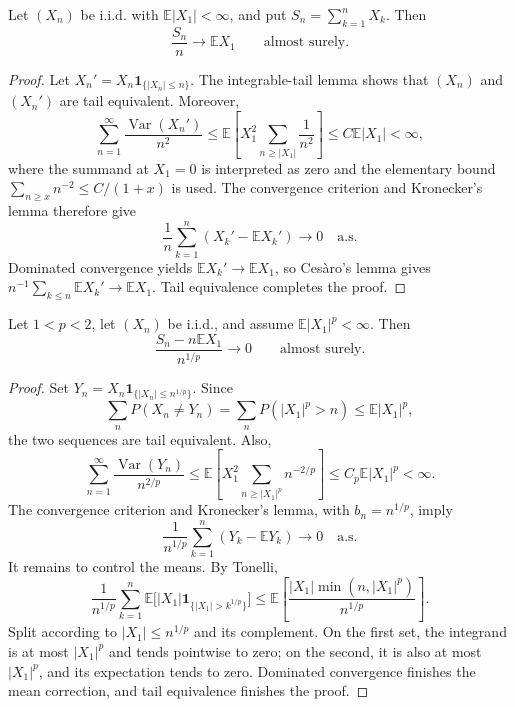 \begin{thm}
Let $(X_n)$ be i.i.d. with $\mathbb E|X_1|<\infty$, and put
$S_n=\sum_{k=1}^{n}X_k$. Then
\[
\frac{S_n}{n}\longrightarrow\mathbb E X_1
\qquad\text{almost surely}.
\]
\end{thm}

\begin{proof}
Let $X_n'=X_n\mathbf1_{\{|X_n|\leq n\}}$. The integrable-tail lemma shows
that $(X_n)$ and $(X_n')$ are tail equivalent. Moreover,
\[
\sum_{n=1}^{\infty}\frac{\operatorname{Var}(X_n')}{n^2}
 \leq\mathbb E\!\left[X_1^2
     \sum_{n\geq |X_1|}\frac1{n^2}\right]
 \leq C\mathbb E|X_1|<\infty,
\]
where the summand at $X_1=0$ is interpreted as zero and the elementary bound
$\sum_{n\geq x}n^{-2}\leq C/(1+x)$ is used. The convergence criterion and
Kronecker's lemma therefore give
\[
\frac1n\sum_{k=1}^{n}(X_k'-\mathbb EX_k')\to0
\quad\text{a.s.}
\]
Dominated convergence yields $\mathbb EX_k'\to\mathbb EX_1$, so Ces\`aro's
lemma gives $n^{-1}\sum_{k\leq n}\mathbb EX_k'\to\mathbb EX_1$. Tail
equivalence completes the proof.
\end{proof}

\begin{thm}
Let $1<p<2$, let $(X_n)$ be i.i.d., and assume
$\mathbb E|X_1|^p<\infty$. Then
\[
\frac{S_n-n\mathbb EX_1}{n^{1/p}}\longrightarrow0
\qquad\text{almost surely}.
\]
\end{thm}

\begin{proof}
Set $Y_n=X_n\mathbf1_{\{|X_n|\leq n^{1/p}\}}$. Since
\[
\sum_nP(X_n\neq Y_n)
 =\sum_nP(|X_1|^p>n)\leq\mathbb E|X_1|^p,
\]
the two sequences are tail equivalent. Also,
\[
\sum_{n=1}^{\infty}\frac{\operatorname{Var}(Y_n)}{n^{2/p}}
 \leq\mathbb E\!\left[X_1^2
      \sum_{n\geq |X_1|^p}n^{-2/p}\right]
 \leq C_p\mathbb E|X_1|^p<\infty.
\]
The convergence criterion and Kronecker's lemma, with $b_n=n^{1/p}$, imply
\[
\frac1{n^{1/p}}\sum_{k=1}^{n}(Y_k-\mathbb EY_k)\to0
\quad\text{a.s.}
\]
It remains to control the means. By Tonelli,
\[
\frac1{n^{1/p}}
\sum_{k=1}^{n}\mathbb E\bigl[|X_1|
 \mathbf1_{\{|X_1|>k^{1/p}\}}\bigr]
\leq
\mathbb E\!\left[
 \frac{|X_1|\min(n,|X_1|^p)}{n^{1/p}}
\right].
\]
Split according to $|X_1|\leq n^{1/p}$ and its complement. On the first set,
the integrand is at most $|X_1|^p$ and tends pointwise to zero; on the second,
it is also at most $|X_1|^p$, and its expectation tends to zero. Dominated
convergence finishes the mean correction, and tail equivalence finishes the
proof.
\end{proof}

